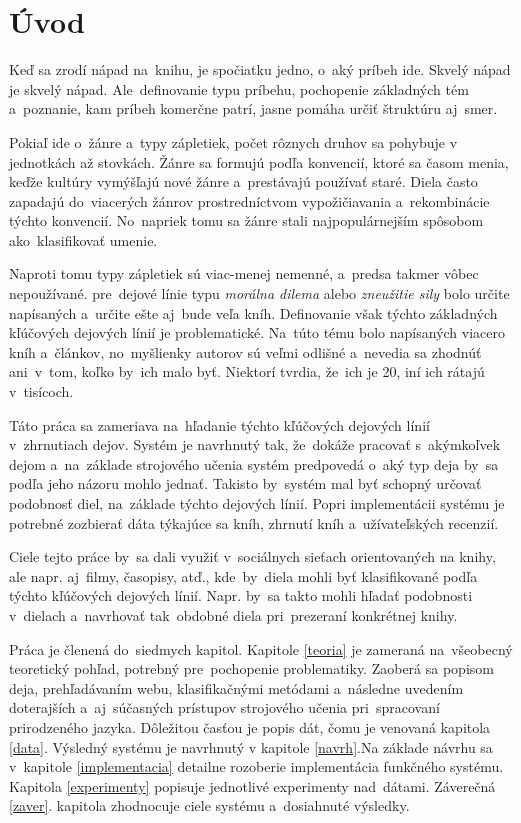 
\chapter{Úvod}

Keď sa zrodí nápad na~knihu, je spočiatku jedno, o~aký príbeh ide. Skvelý nápad je skvelý nápad. Ale~definovanie typu príbehu, pochopenie základných tém a~poznanie, kam príbeh komerčne patrí, jasne pomáha určiť štruktúru aj~smer.

Pokiaľ ide o~žánre a~typy zápletiek, počet rôznych druhov sa pohybuje v jednotkách až stovkách. Žánre sa formujú podľa konvencií, ktoré sa časom menia, keďže kultúry vymýšľajú nové žánre a~prestávajú používať staré. Diela často zapadajú do~viacerých žánrov prostredníctvom vypožičiavania a~rekombinácie týchto konvencií. No~napriek tomu sa žánre stali najpopulárnejším spôsobom ako~klasifikovať umenie.

Naproti tomu typy zápletiek sú viac-menej nemenné, a~predsa takmer vôbec nepoužívané. pre~dejové línie typu \textit{morálna dilema} alebo \textit{zneužitie sily} bolo určite napísaných a~určite ešte aj~bude veľa kníh. Definovanie však týchto základných kľúčových dejových línií je problematické. Na~túto tému bolo napísaných viacero kníh a~článkov, no~myšlienky autorov sú veľmi odlišné a~nevedia sa zhodnúť ani~v~tom, koľko by~ich malo byť. Niektorí tvrdia, že~ich je 20, iní ich rátajú v~tisícoch. 

Táto práca sa zameriava na~hľadanie týchto kľúčových dejových línií v~zhrnutiach dejov. Systém je navrhnutý tak, že~dokáže pracovať s~akýmkoľvek dejom a~na~základe strojového učenia systém predpovedá o~aký typ deja by~sa podľa jeho názoru mohlo jednať. Takisto by~systém mal byť schopný určovať podobnosť diel, na~základe týchto dejových línií. Popri implementácii systému je potrebné zozbierať dáta týkajúce sa kníh, zhrnutí kníh a~užívateľských recenzií.

Ciele tejto práce by~sa dali využiť v~sociálnych sieťach orientovaných na knihy, ale napr. aj~filmy, časopisy, atď., kde~by~diela mohli byť klasifikované podľa týchto kľúčových dejových línií. Napr. by~sa takto mohli hľadať podobnosti v~dielach a~navrhovať tak~obdobné diela pri~prezeraní konkrétnej knihy.

Práca je členená do~siedmych kapitol. Kapitole \ref{teoria} je zameraná na~všeobecný teoretický pohľad, potrebný pre~pochopenie problematiky. Zaoberá sa popisom deja, prehľadávaním webu, klasifikačnými metódami a~následne uvedením doterajších a~aj~súčasných prístupov strojového učenia pri~spracovaní prirodzeného jazyka. Dôležitou časťou je popis dát, čomu je venovaná kapitola \ref{data}. Výsledný systému je navrhnutý v kapitole \ref{navrh}.Na základe návrhu sa v~kapitole \ref{implementacia} detailne rozoberie implementácia funkčného systému. Kapitola \ref{experimenty} popisuje jednotlivé experimenty nad~dátami. Záverečná \ref{zaver}. kapitola zhodnocuje ciele systému a~dosiahnuté výsledky.

